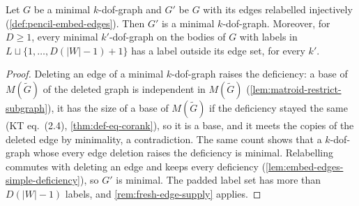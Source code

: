 \begin{lemma}
  \label{lem:embed-edges-minimal}
  \leanok
  Let $G$ be a minimal $k$-dof-graph and $G'$ be $G$ with its edges
  relabelled injectively (\cref{def:pencil-embed-edges}). Then $G'$ is a
  minimal $k$-dof-graph. Moreover, for $D \ge 1$, every minimal
  $k'$-dof-graph on the bodies of $G$ with labels in $L \sqcup
  \{1, \dots, D(|W| - 1) + 1\}$ has a label outside its edge set,
  for every $k'$.
\end{lemma}
\begin{proof}
  \leanok
  Deleting an edge of a minimal $k$-dof-graph raises the deficiency: a
  base of $M(\tilde G)$ of the deleted graph is independent in
  $M(\tilde G)$ (\cref{lem:matroid-restrict-subgraph}), it has the size
  of a base of $M(\tilde G)$ if the deficiency stayed the same (KT
  eq.~(2.4), \cref{thm:def-eq-corank}), so it is a base, and it meets the
  copies of the deleted edge by minimality, a contradiction. The same
  count shows that a $k$-dof-graph whose every edge deletion raises the
  deficiency is minimal. Relabelling commutes with deleting an edge and
  keeps every deficiency (\cref{lem:embed-edges-simple-deficiency}), so
  $G'$ is minimal. The
  padded label set has more than $D(|W| - 1)$ labels, and
  \cref{rem:fresh-edge-supply} applies.
\end{proof}

